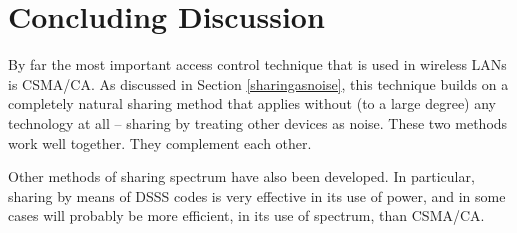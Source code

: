 
\section{Concluding Discussion}

By far the most important access control technique that is used in wireless LANs is
CSMA/CA. As discussed in Section \ref{sharingasnoise}, this technique builds on a
completely natural sharing method that applies without (to a large degree) any
technology at all -- sharing by treating other devices as noise. These two methods
work well together. They complement each other.

Other methods of sharing spectrum have also been developed. In particular, sharing
by means of DSSS codes is very effective in its use of power, and in some cases
will probably be more efficient, in its use of spectrum, than CSMA/CA.

